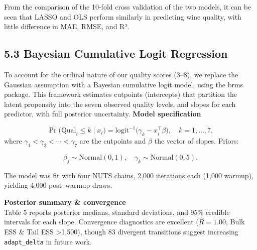 \documentclass[
  doc,floatsintext]{apa6}
\begin{document}
From the comparison of the 10-fold cross validation of the two models, it can be seen that LASSO and OLS perform similarly in predicting wine quality, with little difference in MAE, RMSE, and R².

\subsection{5.3 Bayesian Cumulative Logit Regression}\label{bayesian-cumulative-logit-regression}

To account for the ordinal nature of our quality scores (3--8), we replace the Gaussian assumption with a Bayesian cumulative logit model, using the brms package. This framework estimates cutpoints (intercepts) that partition the latent propensity into the seven observed quality levels, and slopes for each predictor, with full posterior uncertainty.
\textbf{Model specification}

\[
\Pr\bigl(\text{Qual}_i \le k \mid x_i\bigr)
=\mathrm{logit}^{-1}\bigl(\gamma_k - x_i^\top\beta\bigr),
\quad k = 1,\dots,7,
\]
where \(\gamma_1<\gamma_2<\cdots<\gamma_7\) are the cutpoints and \(\beta\) the vector of slopes. Priors:

\[
\beta_j \sim \mathrm{Normal}(0,1),\quad 
\gamma_k \sim \mathrm{Normal}(0,5).
\]

The model was fit with four NUTS chains, 2,000 iterations each (1,000 warmup), yielding 4,000 post--warmup draws.

\textbf{Posterior summary \& convergence}\\
Table 5 reports posterior medians, standard deviations, and 95\% credible intervals for each slope. Convergence diagnostics are excellent (\(\widehat R = 1.00\), Bulk ESS \& Tail ESS \textgreater1,500), though 83 divergent transitions suggest increasing \texttt{adapt\_delta} in future work.
\end{document}
